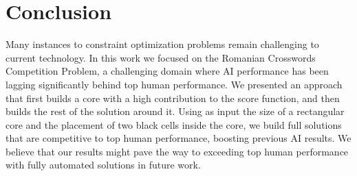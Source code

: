 \section{Conclusion}

Many instances to constraint optimization problems remain challenging to current
technology.
In this work we focused on
the Romanian Crosswords Competition Problem,
a challenging domain where AI performance has been lagging significantly behind top human performance.
We presented an approach that first builds a core with a high contribution to the score function,
and then builds the rest of the solution around it.
Using as input the size of a rectangular core and the placement of two black cells inside the core,
we build full solutions that are competitive to top human performance,
boosting previous AI results.
We believe that our results might pave the way to exceeding top human performance with fully automated solutions in future work.
